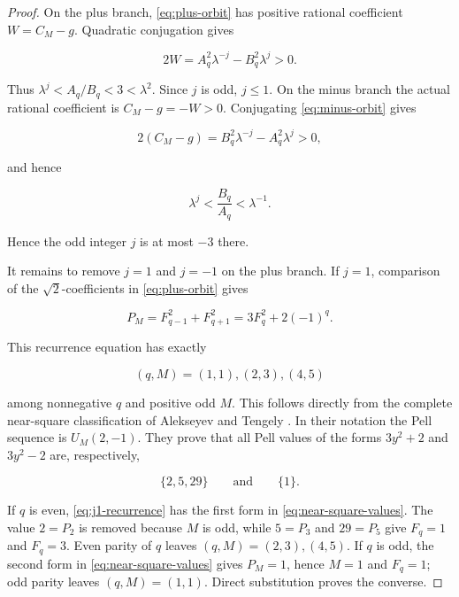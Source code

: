 \begin{proof}
On the plus branch, \cref{eq:plus-orbit} has positive rational coefficient
$W=C_M-g$. Quadratic conjugation gives

\begin{equation}
 2W=A_q^2\lambda^{-j}-B_q^2\lambda^j>0.
\end{equation}

Thus $\lambda^j<A_q/B_q<3<\lambda^2$. Since $j$ is odd, $j\leqslant1$.
On the minus branch the actual rational coefficient is
$C_M-g=-W>0$. Conjugating \cref{eq:minus-orbit} gives

\begin{equation}
 2(C_M-g)=B_q^2\lambda^{-j}-A_q^2\lambda^j>0,
\end{equation}

and hence

\begin{equation}
 \lambda^j<\frac{B_q}{A_q}<\lambda^{-1}.
\end{equation}

Hence the odd integer $j$ is at most $-3$ there.

It remains to remove $j=1$ and $j=-1$ on the plus branch. If $j=1$,
comparison of the $\sqrt2$-coefficients in \cref{eq:plus-orbit} gives

\begin{equation}
 P_M=F_{q-1}^2+F_{q+1}^2
 =3F_q^2+2(-1)^q.
 \label{eq:j1-recurrence}
\end{equation}

This recurrence equation has exactly

\begin{equation}
 (q,M)=(1,1),(2,3),(4,5)
 \label{eq:j1-solutions}
\end{equation}

among nonnegative $q$ and positive odd $M$. This follows directly from the
complete near-square classification of Alekseyev and Tengely
\cite[Table~1]{AlekseyevTengely2014}. In their notation the Pell sequence is
$U_M(2,-1)$. They prove that all Pell values of the forms $3y^2+2$ and
$3y^2-2$ are, respectively,

\begin{equation}
\{2,5,29\}
\qquad\text{and}\qquad
\{1\}.
\label{eq:near-square-values}
\end{equation}

If $q$ is even, \cref{eq:j1-recurrence} has the first form in
\cref{eq:near-square-values}. The value $2=P_2$ is removed because $M$ is
odd, while $5=P_3$ and $29=P_5$ give $F_q=1$ and $F_q=3$. Even parity of
$q$ leaves $(q,M)=(2,3),(4,5)$. If $q$ is odd, the second form in
\cref{eq:near-square-values} gives $P_M=1$, hence $M=1$ and $F_q=1$;
odd parity leaves $(q,M)=(1,1)$. Direct substitution proves the converse.


\end{proof}
